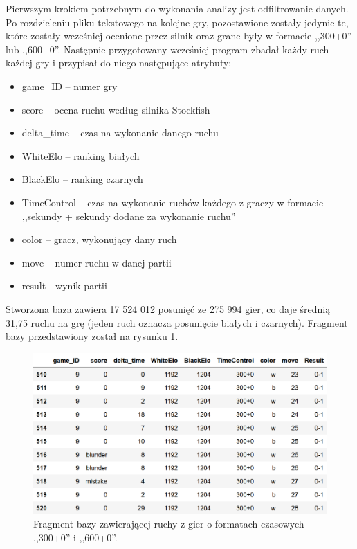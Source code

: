 \documentclass[inzynierska]{pwr_wmat_praca_dyplomowa}
\theoremstyle{plain}
\numberwithin{theorem}{chapter}
\theoremstyle{definition}
\numberwithin{theorem}{chapter}
\begin{document}
Pierwszym krokiem potrzebnym do wykonania analizy jest odfiltrowanie danych.
Po rozdzieleniu pliku tekstowego na kolejne gry, pozostawione zostały jedynie te, które zostały wcześniej ocenione przez silnik oraz grane były w formacie ,,300+0'' lub ,,600+0''. Następnie przygotowany wcześniej program zbadał każdy ruch każdej gry i przypisał do niego następujące atrybuty:
\begin{itemize}
	\item game\_ID -- numer gry
	\item score -- ocena ruchu według silnika Stockfish
	\item delta\_time -- czas na wykonanie danego ruchu
	\item WhiteElo -- ranking białych
	\item BlackElo -- ranking czarnych
	\item TimeControl -- czas na wykonanie ruchów każdego z graczy w formacie  ,,sekundy + sekundy dodane za wykonanie ruchu''
	\item color -- gracz, wykonujący dany ruch
	\item move -- numer ruchu w danej partii
	\item result - wynik partii
\end{itemize}

Stworzona baza zawiera 17 524 012 posunięć ze 275 994 gier, co daje średnią 31,75 ruchu na grę (jeden ruch oznacza posunięcie białych i czarnych). Fragment bazy przedstawiony został na rysunku \ref{rys:baza_ruchow}. 
\begin{figure}[H]
	\centering
	\includegraphics[width=\textwidth]{danee.png}
	\caption{Fragment bazy zawierającej ruchy z gier o formatach czasowych ,,300+0'' i ,,600+0''.}
	\label{rys:baza_ruchow}
\end{figure}
\end{document}
